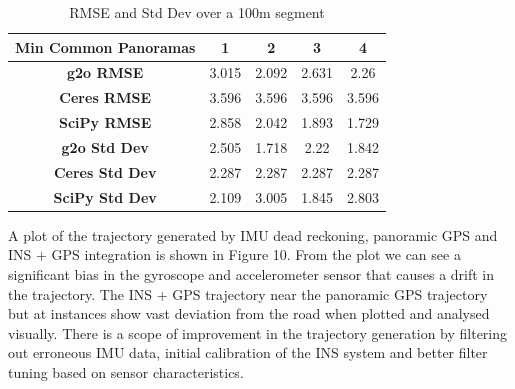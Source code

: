 \documentclass[conference]{IEEEtran}
\begin{document}
\begin{table}[htbp]
\caption{RMSE and Std Dev over a 100m segment}
\begin{center}
\begin{tabular}{|c|c|c|c|c|}
\hline
\textbf{Min Common Panoramas} & 1 & 2 & 3 & 4 \\
\hline
\textbf{g2o RMSE} & 3.015 &  2.092 & 2.631 & 2.26\\
\hline
\textbf{Ceres RMSE} & 3.596 & 3.596 & 3.596 & 3.596\\
\hline
\textbf{SciPy RMSE} & 2.858 & 2.042 & 1.893 & 1.729\\
\hline
\textbf{g2o Std Dev} & 2.505 & 1.718 & 2.22 & 1.842\\
\hline
\textbf{Ceres Std Dev} & 2.287 & 2.287 & 2.287 & 2.287\\
\hline
\textbf{SciPy Std Dev} & 2.109 & 3.005 & 1.845 & 2.803\\
\hline
\end{tabular}
\label{tab2}
\end{center}
\end{table}

A plot of the trajectory generated by IMU dead reckoning, panoramic GPS and INS + GPS integration is shown in Figure 10. From the plot we can see a significant bias in the gyroscope and accelerometer sensor that causes a drift in the trajectory. The INS + GPS trajectory near the panoramic GPS trajectory but at instances show vast deviation from the road when plotted and analysed visually. There is a scope of improvement in the trajectory generation by filtering out erroneous IMU data, initial calibration of the INS system and better filter tuning based on sensor characteristics. 
\end{document}
